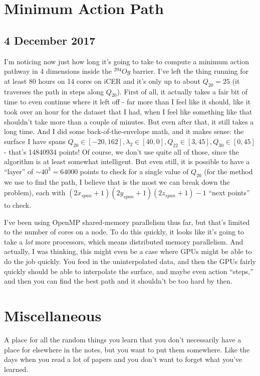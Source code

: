 \documentclass[]{report}
\begin{document}
\section*{Minimum Action Path}
\subsection*{4 December 2017}
I'm noticing now just how long it's going to take to compute a minimum action pathway in 4 dimensions inside the $^{294}Og$ barrier. I've left the thing running for at least 80 hours on 14 cores on iCER and it's only up to about $Q_{20}=25$ (it traverses the path in steps along $Q_{20}$). First of all, it actually takes a fair bit of time to even continue where it left off - far more than I feel like it should, like it took over an hour for the dataset that I had, when I feel like something like that shouldn't take more than a couple of minutes. But even after that, it still takes a long time. And I did some back-of-the-envelope math, and it makes sense: the surface I have spans $Q_{20}\in[-20,162], \lambda_2\in[40,0], Q_{22}\in[3,45], Q_{30}\in[0,45]$ - that's 14840934 points! Of course, we don't use quite all of those, since the algorithm is at least somewhat intelligent. But even still, it is possible to have a ``layer'' of $\sim40^3=64000$ points to check for a single value of $Q_{20}$ (for the method we use to find the path, I believe that is the most we can break down the problem), each with $(2x_{span}+1)(2y_{span}+1)(2z_{span}+1)-1$ ``next points'' to check.

I've been using OpenMP shared-memory parallelism thus far, but that's limited to the number of cores on a node. To do this quickly, it looks like it's going to take a \textit{lot} more processors, which means distributed memory parallelism. And actually, I was thinking, this might even be a case where GPUs might be able to do the job quickly. You feed in the uninterpolated data, and then the GPUs fairly quickly should be able to interpolate the surface, and maybe even action ``steps,'' and then you can find the best path and it shouldn't be too hard by then.

\section*{Miscellaneous}
A place for all the random things you learn that you don't necessarily have a place for elsewhere in the notes, but you want to put them somewhere. Like the days when you read a lot of papers and you don't want to forget what you've learned.
\end{document}

